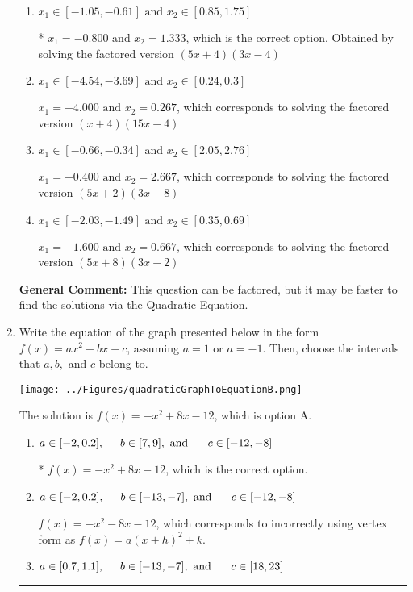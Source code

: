 \documentclass{extbook}[14pt]
\newcommand{\litem}[1]{\item #1

\rule{\textwidth}{0.4pt}}
\begin{document}
\begin{enumerate}
{\begin{enumerate}[label=\Alph*.]
$x_1 = -12.000 \text{ and } x_2 = 20.000$, which corresponds to solving the factored version $(x + 12)(x -20)$
\item \( x_1 \in [-1.05, -0.61] \text{ and } x_2 \in [0.85, 1.75] \)

* $x_1 = -0.800 \text{ and } x_2 = 1.333$, which is the correct option. Obtained by solving the factored version $(5x + 4)(3x -4)$
\item \( x_1 \in [-4.54, -3.69] \text{ and } x_2 \in [0.24, 0.3] \)

$x_1 = -4.000 \text{ and } x_2 = 0.267$, which corresponds to solving the factored version $(x + 4)(15x -4)$
\item \( x_1 \in [-0.66, -0.34] \text{ and } x_2 \in [2.05, 2.76] \)

$x_1 = -0.400 \text{ and } x_2 = 2.667$, which corresponds to solving the factored version $(5x + 2)(3x -8)$
\item \( x_1 \in [-2.03, -1.49] \text{ and } x_2 \in [0.35, 0.69] \)

$x_1 = -1.600 \text{ and } x_2 = 0.667$, which corresponds to solving the factored version $(5x + 8)(3x -2)$
\end{enumerate}

\textbf{General Comment:} This question can be factored, but it may be faster to find the solutions via the Quadratic Equation.
}
\litem{
Write the equation of the graph presented below in the form $f(x)=ax^2+bx+c$, assuming  $a=1$ or $a=-1$. Then, choose the intervals that $a, b,$ and $c$ belong to.

\begin{center}
    \texttt{[image: ../Figures/quadraticGraphToEquationB.png]}
\end{center}


The solution is \( f(x) = -x^{2} +8 x -12 \), which is option A.\begin{enumerate}[label=\Alph*.]
\item \( a \in [-2, 0.2], \hspace*{5mm} b \in [7, 9], \text{ and } \hspace*{5mm} c \in [-12, -8] \)

* $f(x)=-x^{2} +8 x -12$, which is the correct option.
\item \( a \in [-2, 0.2], \hspace*{5mm} b \in [-13, -7], \text{ and } \hspace*{5mm} c \in [-12, -8] \)

$f(x)=-x^{2} -8 x -12$, which corresponds to incorrectly using vertex form as $f(x) = a(x+h)^2+k$.
\item \( a \in [0.7, 1.1], \hspace*{5mm} b \in [-13, -7], \text{ and } \hspace*{5mm} c \in [18, 23] \)


\end{enumerate}}
\end{enumerate}
\end{document}
